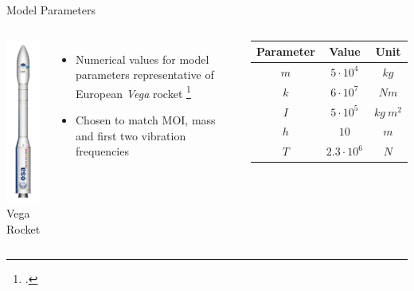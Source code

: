 \documentclass{beamer}
\begin{document}
\begin{frame}{Model Parameters}
\begin{columns}
\centering
\includegraphics[height=0.75\textheight]{images/Vega.png} \\
Vega Rocket
\begin{itemize}
\item Numerical values for model parameters representative of European \emph{Vega} rocket \footcite{Perez2006}
\item Chosen to match MOI, mass and first two vibration frequencies
\end{itemize}
\begin{table}
  \begin{center}
    \begin{tabular}{ ccc }
	\hline
           Parameter & Value & Unit \\
	\hline
      	$m$ & $5 \cdot 10^4$ & $kg$\\
      	$k$ & $6 \cdot 10^7$ & $Nm$\\
      	$I$ & $5 \cdot 10^5$ & $kg~m^2$\\
      	$h$ & $10$ & $m$\\
      	$T$ & $2.3 \cdot 10^6$ & $N$\\
    \end{tabular}
  \end{center}
\end{table}
\end{columns}
\end{frame}
\end{document}
